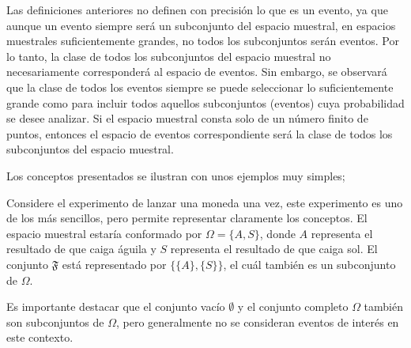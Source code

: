 \documentclass[
  us-letterpaper,
]{scrreprt}
\theoremstyle{plain}
\theoremstyle{definition}
\theoremstyle{definition}
\theoremstyle{plain}
\theoremstyle{remark}
\begin{document}
Las definiciones anteriores no definen con precisión lo que es un
evento, ya que aunque un evento siempre será un subconjunto del espacio
muestral, en espacios muestrales suficientemente grandes, no todos los
subconjuntos serán eventos. Por lo tanto, la clase de todos los
subconjuntos del espacio muestral no necesariamente corresponderá al
espacio de eventos. Sin embargo, se observará que la clase de todos los
eventos siempre se puede seleccionar lo suficientemente grande como para
incluir todos aquellos subconjuntos (eventos) cuya probabilidad se desee
analizar. Si el espacio muestral consta solo de un número finito de
puntos, entonces el espacio de eventos correspondiente será la clase de
todos los subconjuntos del espacio muestral.

Los conceptos presentados se ilustran con unos ejemplos muy simples;

\begin{tcolorbox}[enhanced jigsaw, bottomtitle=1mm, coltitle=black, breakable, leftrule=.75mm, left=2mm, rightrule=.15mm, titlerule=0mm, toprule=.15mm, toptitle=1mm, colback=white, colframe=quarto-callout-caution-color-frame, title={Ejemplo (\textbf{\emph{Lanzamiento de una moneda}})}, colbacktitle=quarto-callout-caution-color!10!white, arc=.35mm, bottomrule=.15mm, opacitybacktitle=0.6, opacityback=0]

Considere el experimento de lanzar una moneda una vez, este experimento
es uno de los más sencillos, pero permite representar claramente los
conceptos. El espacio muestral estaría conformado por
\(\Omega = \{A, S\}\), donde \(A\) representa el resultado de que caiga
águila y \(S\) representa el resultado de que caiga sol. El conjunto
\(\mathfrak{F}\) está representado por \(\{\{A\}, \{S\}\}\), el cuál
también es un subconjunto de \(\Omega\).

Es importante destacar que el conjunto vacío \(\emptyset\) y el conjunto
completo \(\Omega\) también son subconjuntos de \(\Omega\), pero
generalmente no se consideran eventos de interés en este contexto.

\end{tcolorbox}
\end{document}
